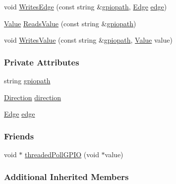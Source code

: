 \begin{DoxyCompactItemize}
\item 
void \hyperlink{class_hardware_1_1_g_p_i_o_a99e41223fcd93f47f3acf4851fc32de2}{Writes\+Edge} (const string \&\hyperlink{class_hardware_1_1_g_p_i_o_ac47062ed6aba52b9e8506e1575bf5061}{gpiopath}, \hyperlink{class_hardware_1_1_g_p_i_o_a9a7595aabdac9aec75f22e8b86342162}{Edge} \hyperlink{class_hardware_1_1_g_p_i_o_adf15f74f053069029e99934e28c109e0}{edge})
\item 
\hyperlink{class_hardware_1_1_g_p_i_o_ad357201dc1ad13ad96ba1773108a5f6d}{Value} \hyperlink{class_hardware_1_1_g_p_i_o_a2af76b35edfeae57ee5393f8455e2522}{Reads\+Value} (const string \&\hyperlink{class_hardware_1_1_g_p_i_o_ac47062ed6aba52b9e8506e1575bf5061}{gpiopath})
\item 
void \hyperlink{class_hardware_1_1_g_p_i_o_a143da5d0e47450cd4080754d81026dc9}{Writes\+Value} (const string \&\hyperlink{class_hardware_1_1_g_p_i_o_ac47062ed6aba52b9e8506e1575bf5061}{gpiopath}, \hyperlink{class_hardware_1_1_g_p_i_o_ad357201dc1ad13ad96ba1773108a5f6d}{Value} value)
\end{DoxyCompactItemize}
\subsubsection*{Private Attributes}
\begin{DoxyCompactItemize}
\item 
string \hyperlink{class_hardware_1_1_g_p_i_o_ac47062ed6aba52b9e8506e1575bf5061}{gpiopath}
\item 
\hyperlink{class_hardware_1_1_g_p_i_o_a7507431d6341c146f22dcdb21b78ffd4}{Direction} \hyperlink{class_hardware_1_1_g_p_i_o_a77e93e4f6650507fdc4898d272d540e7}{direction}
\item 
\hyperlink{class_hardware_1_1_g_p_i_o_a9a7595aabdac9aec75f22e8b86342162}{Edge} \hyperlink{class_hardware_1_1_g_p_i_o_adf15f74f053069029e99934e28c109e0}{edge}
\end{DoxyCompactItemize}
\subsubsection*{Friends}
\begin{DoxyCompactItemize}
\item 
void $\ast$ \hyperlink{class_hardware_1_1_g_p_i_o_aac791b3d71615b988c52d994896fdbec}{threaded\+Poll\+G\+P\+I\+O} (void $\ast$value)
\end{DoxyCompactItemize}
\subsubsection*{Additional Inherited Members}


